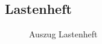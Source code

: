 \subsection{Lastenheft}
\label{app:Lastenheft}
\begin{figure}[htb]
\centering
{}
\caption{Auszug Lastenheft}
\end{figure}
\clearpage